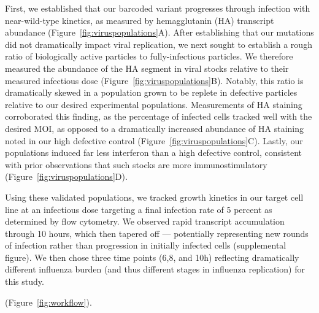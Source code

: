\documentclass[9pt,lineno]{elife}
\begin{document}
	First, we established that our barcoded variant progresses through infection with near-wild-type kinetics, as measured by hemagglutanin (HA) transcript abundance (Figure~\ref{fig:viruspopulations}A). After establishing that our mutations did not dramatically impact viral replication, we next sought to establish a rough ratio of biologically active particles to fully-infectious particles.  We therefore measured the abundance of the HA segment in viral stocks relative to their measured infectious dose (Figure~\ref{fig:viruspopulations}B). Notably, this ratio is dramatically skewed in a population grown to be replete in defective particles relative to our desired experimental populations. Measurements of HA staining corroborated this finding, as the percentage of infected cells tracked well with the desired MOI, as opposed to a dramatically increased abundance of HA staining noted in our high defective control  (Figure~\ref{fig:viruspopulations}C). Lastly, our populations induced far less interferon than a high defective control, consistent with prior observations that such stocks are more immunostimulatory (Figure~\ref{fig:viruspopulations}D).
	
	Using these validated populations, we tracked growth kinetics in our target cell line at an infectious dose targeting a final infection rate of 5 percent as determined by flow cytometry. We observed rapid transcript accumulation through 10 hours, which then tapered off --- potentially representing new rounds of infection rather than progression in initially infected cells (supplemental figure). We then chose three time points (6,8, and 10h) reflecting dramatically different influenza burden (and thus different stages in influenza replication) for this study.



 (Figure~\ref{fig:workflow}).
\end{document}
